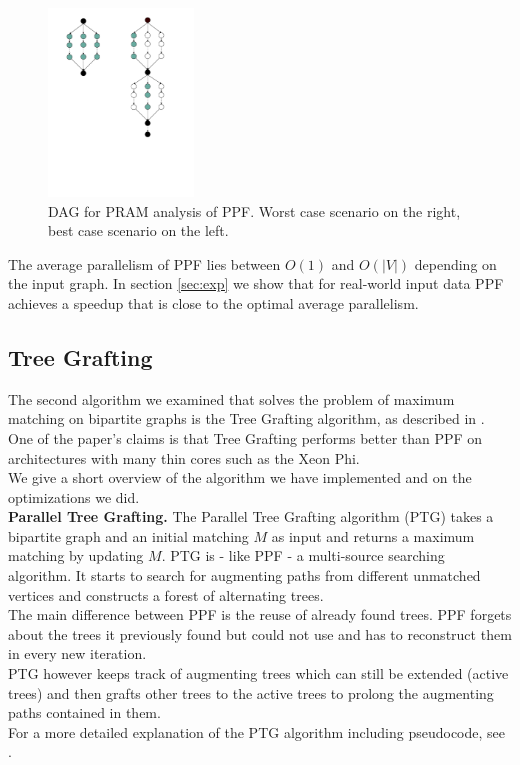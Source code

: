 \documentclass[letterpaper]{article}
\newcommand{\mypar}[1]{{\bf #1.}}
\begin{document}
\begin{figure}\centering
  \includegraphics[height=5cm, trim={2.5cm 8cm 4cm 1cm}, clip]{PRAM.pdf}
  \caption{DAG for PRAM analysis of PPF. Worst case scenario on the right, best case scenario on the left.}
  \label{fig:pram}
\end{figure}

The average parallelism of PPF lies between $O(1)$ and $O(|V|)$ depending on the input graph. 
In section \ref{sec:exp} we show that for real-world input data PPF achieves a speedup that is close to the optimal average parallelism.

\subsection{Tree Grafting}\label{sec:tg}

The second algorithm we examined that solves the problem of maximum matching on bipartite graphs is the Tree Grafting algorithm, as described in \cite{Azad:2015}. One of the paper's claims is that Tree Grafting performs better than PPF on architectures with many thin cores such as the Xeon Phi. \\
We give a short overview of the algorithm we have implemented and on the optimizations we did. \\

\mypar{Parallel Tree Grafting} 
The Parallel Tree Grafting algorithm (PTG) takes a bipartite graph and an initial matching $M$ as input and returns a maximum matching by updating $M$.
PTG is - like PPF - a multi-source searching algorithm. It starts to search for augmenting paths from different unmatched vertices and constructs a forest of alternating trees.\\
The main difference between PPF is the reuse of already found trees. PPF forgets about the trees it previously found but could not use and has to reconstruct them in every new iteration.\\
PTG however keeps track of augmenting trees which can still be extended (active trees) and then grafts other trees to the active trees to prolong the augmenting paths contained in them.\\
For a more detailed explanation of the PTG algorithm including pseudocode, see \cite{Azad:2015}.\\
\end{document}
